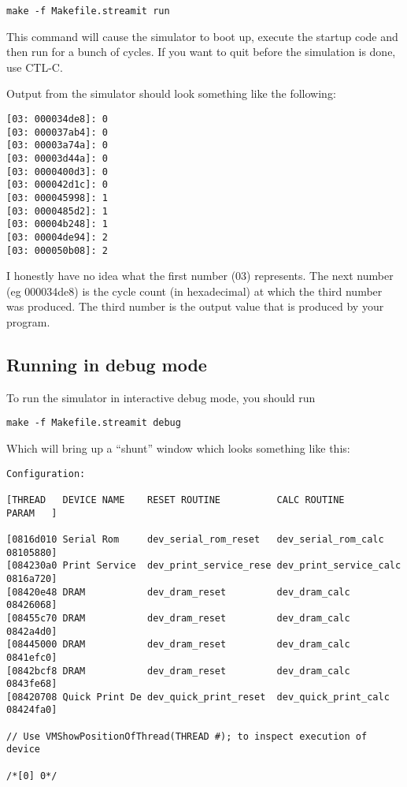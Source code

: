 \documentclass{article}
\begin{document}
\begin{verbatim}make -f Makefile.streamit run\end{verbatim}

This command will cause the simulator to boot up, execute the startup code
and then run for a bunch of cycles. If you want to quit before the 
simulation is done, use CTL-C. 

Output from the simulator should look something like the following:
\begin{verbatim}
[03: 000034de8]: 0
[03: 000037ab4]: 0
[03: 00003a74a]: 0
[03: 00003d44a]: 0
[03: 0000400d3]: 0
[03: 000042d1c]: 0
[03: 000045998]: 1
[03: 0000485d2]: 1
[03: 00004b248]: 1
[03: 00004de94]: 2
[03: 000050b08]: 2
\end{verbatim}

I honestly have no idea what the first number (03) represents. The next number 
(eg 000034de8) is the cycle count (in hexadecimal) at which the third number was produced. The 
third number is the output value that is produced by your program.

\subsection{Running in debug mode}
To run the simulator in interactive debug mode, you should run
\begin{verbatim}make -f Makefile.streamit debug\end{verbatim}

Which will bring up a ``shunt'' window which looks something like this:

\begin{verbatim}
Configuration: 

[THREAD   DEVICE NAME    RESET ROUTINE          CALC ROUTINE           PARAM   ]

[0816d010 Serial Rom     dev_serial_rom_reset   dev_serial_rom_calc    08105880]
[084230a0 Print Service  dev_print_service_rese dev_print_service_calc 0816a720]
[08420e48 DRAM           dev_dram_reset         dev_dram_calc          08426068]
[08455c70 DRAM           dev_dram_reset         dev_dram_calc          0842a4d0]
[08445000 DRAM           dev_dram_reset         dev_dram_calc          0841efc0]
[0842bcf8 DRAM           dev_dram_reset         dev_dram_calc          0843fe68]
[08420708 Quick Print De dev_quick_print_reset  dev_quick_print_calc   08424fa0]

// Use VMShowPositionOfThread(THREAD #); to inspect execution of device 

/*[0] 0*/ 
\end{verbatim}
\end{document}
